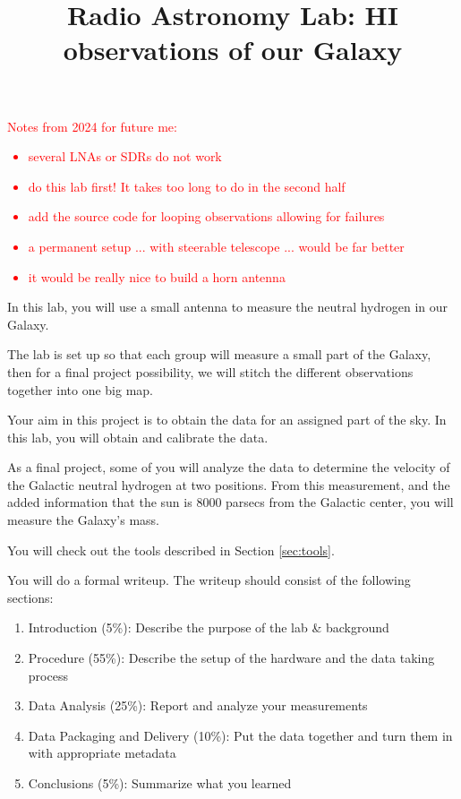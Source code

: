 \documentclass[11pt]{article}
\begin{document}
\title{Radio Astronomy Lab: HI observations of our Galaxy}

\textcolor{red}{Notes from 2024 for future me:
\begin{itemize}
    \item several LNAs or SDRs do not work
    \item do this lab first!  It takes too long to do in the second half
    \item add the source code for looping observations allowing for failures
    \item a permanent setup ... with steerable telescope ... would be far better
    \item it would be really nice to build a horn antenna
\end{itemize}
}

In this lab, you will use a small antenna to measure the neutral hydrogen in
our Galaxy.

The lab is set up so that each group will measure a small part of the Galaxy,
then for a final project possibility, we will stitch the different observations
together into one big map.

Your aim in this project is to obtain the data for an assigned part of the sky.
In this lab, you will obtain and calibrate the data.

As a final project, some of you will analyze the data to determine the velocity
of the Galactic neutral hydrogen at two positions.  From this measurement, and
the added information that the sun is 8000 parsecs from the Galactic center,
you will measure the Galaxy's mass.

You will check out the tools described in Section \ref{sec:tools}.

You will do a formal writeup.  The writeup should consist of the following sections:
\begin{enumerate}
    \item Introduction (5\%): Describe the purpose of the lab \& background
    \item Procedure (55\%): Describe the setup of the hardware and the data taking process
    \item Data Analysis (25\%):  Report and analyze your measurements
    \item Data Packaging and Delivery (10\%): Put the data together and turn them in with appropriate metadata
    \item Conclusions (5\%): Summarize what you learned
\end{enumerate}
\end{document}
